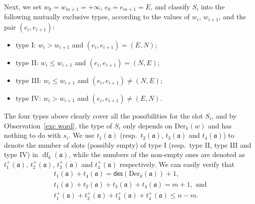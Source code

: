 \documentclass[12pt]{amsart}
\numberwithin{equation}{section}
\theoremstyle{plain}
\theoremstyle{definition}
\def\Der{\mathrm{Der}}
\def\des{\mathsf{des}}
\def\a{\mathfrak{a}}
\def\df{\operatorname{df}}
\begin{document}
Next, we set $w_0=w_{m+1}=+\infty$, $e_0=e_{m+1}=E$, and classify $S_i$ into the following mutually exclusive types, according to the values of $w_i$, $w_{i+1}$, and the pair $(e_i,e_{i+1})$:
\begin{itemize}
	\item type I: $w_{i} > w_{i+1}$ and $(e_i,e_{i+1})=(E,N)$;
	\item type II: $w_{i} \le w_{i+1}$ and $(e_i,e_{i+1})=(N,E)$;
	\item type III: $w_{i} \le w_{i+1}$ and $(e_i,e_{i+1})\not=(N,E)$;
	\item type IV: $w_{i} > w_{i+1}$ and $(e_i,e_{i+1})\not=(E,N)$.
\end{itemize}

The four types above clearly cover all the possibilities for the slot $S_i$, and by Observation~\ref{exc word}, the type of $S_i$ only depends on $\Der_k(w)$ and has nothing to do with $s_i$. We use $t_1(\a)$ (resp.~$t_2(\a)$, $t_3(\a)$ and $t_4(\a)$) to denote the number of slots (possibly empty) of type I (resp.~type II, type III and type IV) in $\df_k(\a)$, while the numbers of the non-empty ones are denoted as $t_1^{+}(\a)$, $t_2^{+}(\a)$, $t_3^{+}(\a)$ and $t_4^{+}(\a)$ respectively. We can easily verify that
\begin{align*}
&t_1(\a)+t_4(\a) = \des(\Der_k(\a))+1,\\
&t_1(\a)+t_2(\a)+t_3(\a)+t_4(\a) = m+1, \text{ and }\\
&t_1^+(\a)+t_2^+(\a)+t_3^+(\a)+t_4^+(\a) \le n-m.
\end{align*}
\end{document}
